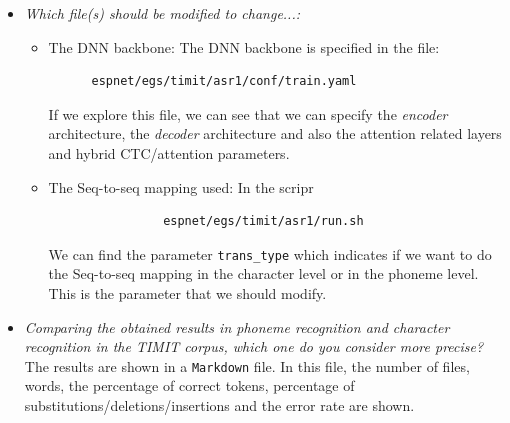 \documentclass[a4paper]{article}
\def\inline{\lstinline[basicstyle=\ttfamily,keywordstyle={}]}
\begin{document}
\begin{itemize}
  \item \emph{Which file(s) should be modified to change...:}
        \begin{itemize}
          \item The DNN backbone: The DNN backbone is specified in the file:
                \begin{verbatim}
      espnet/egs/timit/asr1/conf/train.yaml
    \end{verbatim}
                If we explore this file, we can see that we can specify the \emph{encoder} architecture, the \emph{decoder} architecture and also the attention related layers and hybrid CTC/attention parameters.
          \item The Seq-to-seq mapping used: In the scripr
                \begin{verbatim}
                espnet/egs/timit/asr1/run.sh
\end{verbatim}
                We can find the parameter \inline{trans_type} which indicates if we want to do the Seq-to-seq mapping in the character level or in the phoneme level. This is the parameter that we should modify.
        \end{itemize}

  \item \emph{Comparing the obtained results in phoneme recognition and character recognition in the TIMIT corpus, which one do you consider more precise?}\\

        The results are shown in a \inline{Markdown} file. In this file, the number of files, words, the percentage of correct tokens, percentage of substitutions/deletions/insertions and the error rate are shown.


\end{itemize}
\end{document}
